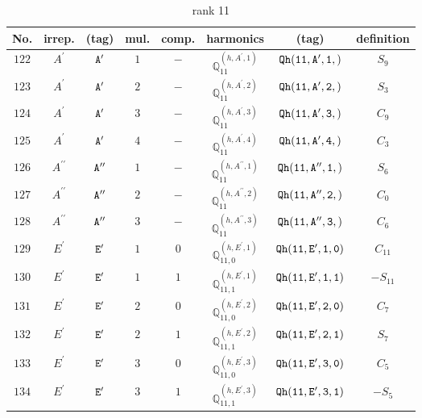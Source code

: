 \documentclass[fleqn,8pt]{jsarticle}
\begin{document}
\begin{table}[ht!]
\begin{center}
\caption{rank 11}
\renewcommand{\arraystretch}{1.3}
\begin{tabular}{cccccccc} \hline \hline
No. & irrep. & (tag) & mul. & comp. & harmonics & (tag) & definition \\ \hline
$ 122 $ & $ A^{\prime} $ & $ {\tt A'} $ & $ 1 $ & $ - $ & $ \mathbb{Q}_{11}^{(h,A^{\prime},1)} $ & $ {\tt Qh(11,A',1,)} $ & $ S_{9} $ \\
$ 123 $ & $ A^{\prime} $ & $ {\tt A'} $ & $ 2 $ & $ - $ & $ \mathbb{Q}_{11}^{(h,A^{\prime},2)} $ & $ {\tt Qh(11,A',2,)} $ & $ S_{3} $ \\
$ 124 $ & $ A^{\prime} $ & $ {\tt A'} $ & $ 3 $ & $ - $ & $ \mathbb{Q}_{11}^{(h,A^{\prime},3)} $ & $ {\tt Qh(11,A',3,)} $ & $ C_{9} $ \\
$ 125 $ & $ A^{\prime} $ & $ {\tt A'} $ & $ 4 $ & $ - $ & $ \mathbb{Q}_{11}^{(h,A^{\prime},4)} $ & $ {\tt Qh(11,A',4,)} $ & $ C_{3} $ \\
$ 126 $ & $ A^{\prime\prime} $ & $ {\tt A''} $ & $ 1 $ & $ - $ & $ \mathbb{Q}_{11}^{(h,A^{\prime\prime},1)} $ & $ {\tt Qh(11,A'',1,)} $ & $ S_{6} $ \\
$ 127 $ & $ A^{\prime\prime} $ & $ {\tt A''} $ & $ 2 $ & $ - $ & $ \mathbb{Q}_{11}^{(h,A^{\prime\prime},2)} $ & $ {\tt Qh(11,A'',2,)} $ & $ C_{0} $ \\
$ 128 $ & $ A^{\prime\prime} $ & $ {\tt A''} $ & $ 3 $ & $ - $ & $ \mathbb{Q}_{11}^{(h,A^{\prime\prime},3)} $ & $ {\tt Qh(11,A'',3,)} $ & $ C_{6} $ \\
$ 129 $ & $ E^{\prime} $ & $ {\tt E'} $ & $ 1 $ & $ 0 $ & $ \mathbb{Q}_{11,0}^{(h,E^{\prime},1)} $ & $ {\tt Qh(11,E',1,0)} $ & $ C_{11} $ \\
$ 130 $ & $ E^{\prime} $ & $ {\tt E'} $ & $ 1 $ & $ 1 $ & $ \mathbb{Q}_{11,1}^{(h,E^{\prime},1)} $ & $ {\tt Qh(11,E',1,1)} $ & $ - S_{11} $ \\
$ 131 $ & $ E^{\prime} $ & $ {\tt E'} $ & $ 2 $ & $ 0 $ & $ \mathbb{Q}_{11,0}^{(h,E^{\prime},2)} $ & $ {\tt Qh(11,E',2,0)} $ & $ C_{7} $ \\
$ 132 $ & $ E^{\prime} $ & $ {\tt E'} $ & $ 2 $ & $ 1 $ & $ \mathbb{Q}_{11,1}^{(h,E^{\prime},2)} $ & $ {\tt Qh(11,E',2,1)} $ & $ S_{7} $ \\
$ 133 $ & $ E^{\prime} $ & $ {\tt E'} $ & $ 3 $ & $ 0 $ & $ \mathbb{Q}_{11,0}^{(h,E^{\prime},3)} $ & $ {\tt Qh(11,E',3,0)} $ & $ C_{5} $ \\
$ 134 $ & $ E^{\prime} $ & $ {\tt E'} $ & $ 3 $ & $ 1 $ & $ \mathbb{Q}_{11,1}^{(h,E^{\prime},3)} $ & $ {\tt Qh(11,E',3,1)} $ & $ - S_{5} $ \\

\end{tabular}
\end{center}
\end{table}
\end{document}
